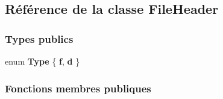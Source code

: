 \hypertarget{class_file_header}{}\subsection{Référence de la classe File\+Header}
\label{class_file_header}
\subsubsection*{Types publics}
\begin{DoxyCompactItemize}
\item 
\hypertarget{class_file_header_a56c06d0f178e349f85def594f9a6ff3c}{}\label{class_file_header_a56c06d0f178e349f85def594f9a6ff3c} 
enum {\bfseries Type} \{ {\bfseries f}, 
{\bfseries d}
 \}
\end{DoxyCompactItemize}
\subsubsection*{Fonctions membres publiques}
